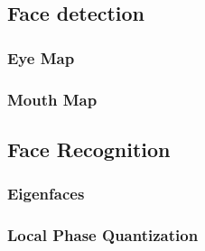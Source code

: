 \lipsum[10]
\subsection{Face detection}
\subsubsection{Eye Map}
\label{sub:FaceDetection}


\subsubsection{Mouth Map}



\subsection{Face Recognition}
\label{sub:FaceRecognition}


\subsubsection{Eigenfaces}
\label{subs:Eigenfaces}


\subsubsection{Local Phase Quantization}
\label{subs:LocalPhaseQuantization}

